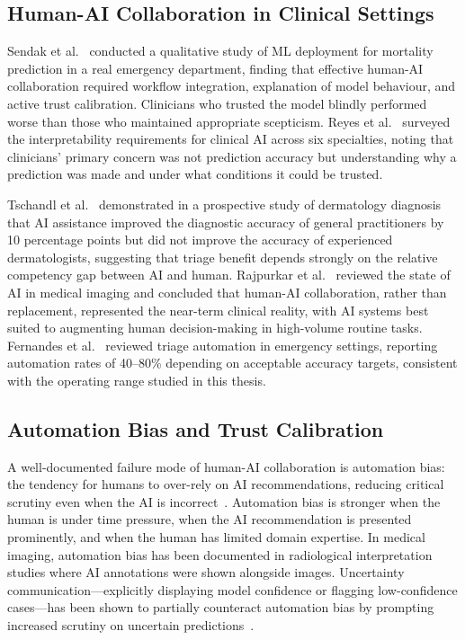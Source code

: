 \subsection{Human-AI Collaboration in Clinical Settings}

Sendak et al.~\cite{sendak2020human} conducted a qualitative study of ML deployment for mortality prediction in a real emergency department, finding that effective human-AI collaboration required workflow integration, explanation of model behaviour, and active trust calibration. Clinicians who trusted the model blindly performed worse than those who maintained appropriate scepticism. Reyes et al.~\cite{reyes2020interpretability} surveyed the interpretability requirements for clinical AI across six specialties, noting that clinicians' primary concern was not prediction accuracy but understanding why a prediction was made and under what conditions it could be trusted.

Tschandl et al.~\cite{tschandl2020human} demonstrated in a prospective study of dermatology diagnosis that AI assistance improved the diagnostic accuracy of general practitioners by 10 percentage points but did not improve the accuracy of experienced dermatologists, suggesting that triage benefit depends strongly on the relative competency gap between AI and human. Rajpurkar et al.~\cite{rajpurkar2022ai} reviewed the state of AI in medical imaging and concluded that human-AI collaboration, rather than replacement, represented the near-term clinical reality, with AI systems best suited to augmenting human decision-making in high-volume routine tasks. Fernandes et al.~\cite{fernandes2024use} reviewed triage automation in emergency settings, reporting automation rates of 40--80\% depending on acceptable accuracy targets, consistent with the operating range studied in this thesis.

\subsection{Automation Bias and Trust Calibration}

A well-documented failure mode of human-AI collaboration is automation bias: the tendency for humans to over-rely on AI recommendations, reducing critical scrutiny even when the AI is incorrect~\cite{goddard2012automation}. Automation bias is stronger when the human is under time pressure, when the AI recommendation is presented prominently, and when the human has limited domain expertise. In medical imaging, automation bias has been documented in radiological interpretation studies where AI annotations were shown alongside images. Uncertainty communication—explicitly displaying model confidence or flagging low-confidence cases—has been shown to partially counteract automation bias by prompting increased scrutiny on uncertain predictions~\cite{cai2019hello}.

